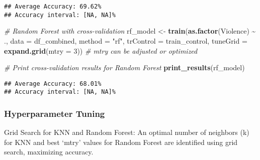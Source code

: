 \documentclass[
]{article}
\newenvironment{Shaded}{\begin{snugshade}}{\end{snugshade}}
\newcommand{\AttributeTok}[1]{\textcolor[rgb]{0.13,0.29,0.53}{#1}}
\newcommand{\CommentTok}[1]{\textcolor[rgb]{0.56,0.35,0.01}{\textit{#1}}}
\newcommand{\DecValTok}[1]{\textcolor[rgb]{0.00,0.00,0.81}{#1}}
\newcommand{\FunctionTok}[1]{\textcolor[rgb]{0.13,0.29,0.53}{\textbf{#1}}}
\newcommand{\NormalTok}[1]{#1}
\newcommand{\OtherTok}[1]{\textcolor[rgb]{0.56,0.35,0.01}{#1}}
\newcommand{\SpecialCharTok}[1]{\textcolor[rgb]{0.81,0.36,0.00}{\textbf{#1}}}
\newcommand{\StringTok}[1]{\textcolor[rgb]{0.31,0.60,0.02}{#1}}
\begin{document}
\begin{verbatim}
## Average Accuracy: 69.62%
## Accuracy interval: [NA, NA]%
\end{verbatim}

\begin{Shaded}
\begin{Highlighting}[]
\CommentTok{\# Random Forest with cross{-}validation}
\NormalTok{rf\_model }\OtherTok{\textless{}{-}} \FunctionTok{train}\NormalTok{(}\FunctionTok{as.factor}\NormalTok{(Violence) }\SpecialCharTok{\textasciitilde{}}\NormalTok{ ., }\AttributeTok{data =}\NormalTok{ df\_combined, }
                  \AttributeTok{method =} \StringTok{"rf"}\NormalTok{, }
                  \AttributeTok{trControl =}\NormalTok{ train\_control, }
                  \AttributeTok{tuneGrid =} \FunctionTok{expand.grid}\NormalTok{(}\AttributeTok{mtry =} \DecValTok{3}\NormalTok{))  }\CommentTok{\# mtry can be adjusted or optimized}

\CommentTok{\# Print cross{-}validation results for Random Forest}
\FunctionTok{print\_results}\NormalTok{(rf\_model)}
\end{Highlighting}
\end{Shaded}

\begin{verbatim}
## Average Accuracy: 68.01%
## Accuracy interval: [NA, NA]%
\end{verbatim}

\hypertarget{hyperparameter-tuning}{%
\subsubsection{Hyperparameter Tuning}\label{hyperparameter-tuning}}

Grid Search for KNN and Random Forest: An optimal number of neighbors
(k) for KNN and best `mtry' values for Random Forest are identified
using grid search, maximizing accuracy.
\end{document}
